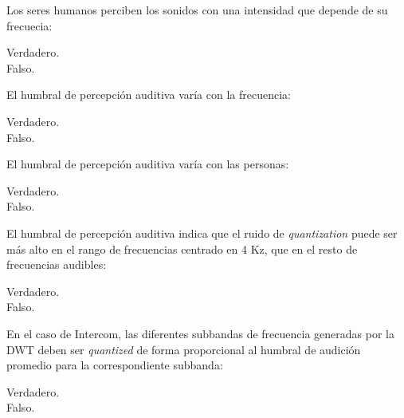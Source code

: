 \documentclass[legalpaper, 12pt, addpoints]{exam}
\begin{document}
\begin{questions}
\vspace{0.10in}

\question Los seres humanos perciben los sonidos con una intensidad
que depende de su frecuecia:

\begin{oneparchoices}
  \choice Verdadero.\\
  \choice Falso.
\end{oneparchoices}
  
\vspace{0.10in}

\question El humbral de percepción auditiva varía con la frecuencia:

\begin{oneparchoices}
  \choice Verdadero.\\
  \choice Falso.
\end{oneparchoices}
  
\vspace{0.10in}

\question El humbral de percepción auditiva varía con las personas:

\begin{oneparchoices}
  \choice Verdadero.\\
  \choice Falso.
\end{oneparchoices}
  
\vspace{0.10in}

\question El humbral de percepción auditiva indica que el ruido de
\emph{quantization} puede ser más alto en el rango de frecuencias
centrado en 4 Kz, que en el resto de frecuencias audibles:

\begin{oneparchoices}
  \choice Verdadero.\\
  \choice Falso.
\end{oneparchoices}
  
\vspace{0.10in}

\question En el caso de Intercom, las diferentes subbandas de
frecuencia generadas por la DWT deben ser \emph{quantized} de forma
proporcional al humbral de audición promedio para la correspondiente
subbanda:

\begin{oneparchoices}
  \choice Verdadero.\\
  \choice Falso.
\end{oneparchoices}
  
\vspace{0.10in}


\end{questions}
\end{document}
